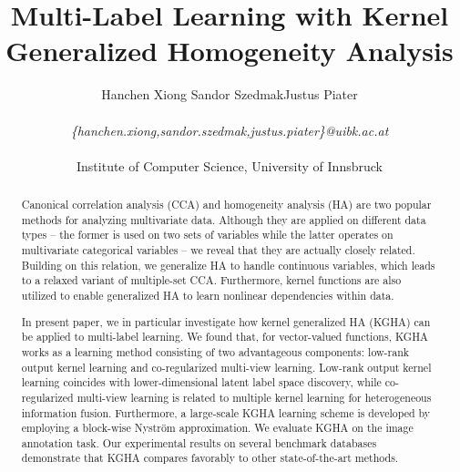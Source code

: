 \documentclass[a4paper]{article}
\title{Multi-Label Learning with Kernel Generalized Homogeneity Analysis}
\date{}
\author{Hanchen Xiong \quad Sandor Szedmak\quad Justus Piater\\ \\
	\textit{\{hanchen.xiong,sandor.szedmak,justus.piater\}@uibk.ac.at} \\ \\
Institute of Computer Science, University of Innsbruck}
\begin{document}
 
\maketitle



\begin{abstract} 
Canonical correlation analysis (CCA) and homogeneity analysis (HA) are two popular methods for analyzing multivariate data. Although they are applied on
different data types -- the former is used on two sets of variables while the latter operates on multivariate categorical variables -- we reveal that 
they are actually closely related. Building on this relation, we generalize HA to handle continuous variables, which leads to a 
relaxed variant of multiple-set CCA. Furthermore, kernel functions are also utilized to enable generalized HA to learn nonlinear dependencies within data.

In present paper, we in particular investigate how kernel generalized HA (KGHA) can be applied to multi-label learning. We found that, for vector-valued functions, KGHA works as a       
learning method consisting of two advantageous components: low-rank output kernel learning and co-regularized multi-view learning. 
Low-rank output kernel learning coincides with lower-dimensional 
latent label space discovery, while co-regularized multi-view learning is related to multiple kernel learning for heterogeneous information fusion. 
Furthermore, a large-scale KGHA learning scheme is developed by employing a block-wise Nystr{\"o}m approximation.      
We evaluate KGHA on the image annotation task.
Our experimental results on several benchmark databases demonstrate that KGHA compares favorably to other state-of-the-art methods.\end{abstract} 
\end{document}
